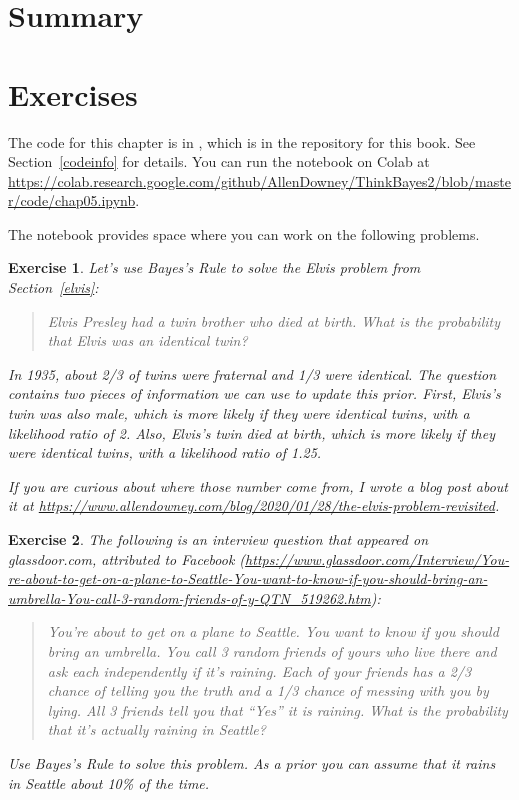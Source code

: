 \documentclass[12pt]{book}
\theoremstyle{exercise}
\newtheorem{exercise}{Exercise}[chapter]
\begin{document}
\section{Summary}

\section{Exercises}

The code for this chapter is in , which is in the repository for this book.  See Section~\ref{codeinfo} for details.
You can run the notebook on Colab at \url{https://colab.research.google.com/github/AllenDowney/ThinkBayes2/blob/master/code/chap05.ipynb}.

The notebook provides space where you can work on the following problems.


\begin{exercise}
Let's use Bayes's Rule to solve the Elvis problem from Section~\ref{elvis}:

\begin{quote}
Elvis Presley had a twin brother who died at birth. What is the probability that Elvis was an identical twin?
\end{quote}

In 1935, about 2/3 of twins were fraternal and 1/3 were identical.
The question contains two pieces of information we can use to update this prior.
First, Elvis's twin was also male, which is more likely if they were identical twins, with a likelihood ratio of 2.
Also, Elvis's twin died at birth, which is more likely if they were identical twins, with a likelihood ratio of 1.25.

If you are curious about where those number come from, I wrote a blog post about it at \url{https://www.allendowney.com/blog/2020/01/28/the-elvis-problem-revisited}.
\end{exercise}


\begin{exercise}
The following is an interview question that appeared on glassdoor.com, attributed to Facebook (\url{https://www.glassdoor.com/Interview/You-re-about-to-get-on-a-plane-to-Seattle-You-want-to-know-if-you-should-bring-an-umbrella-You-call-3-random-friends-of-y-QTN_519262.htm}):

\begin{quote}
You're about to get on a plane to Seattle. You want to know if you should bring an umbrella. You call 3 random friends of yours who live there and ask each independently if it's raining. Each of your friends has a 2/3 chance of telling you the truth and a 1/3 chance of messing with you by lying. All 3 friends tell you that ``Yes'' it is raining. What is the probability that it's actually raining in Seattle?
\end{quote}

Use Bayes's Rule to solve this problem.  As a prior you can assume that it rains in Seattle about 10\% of the time.
\end{exercise}
\end{document}
